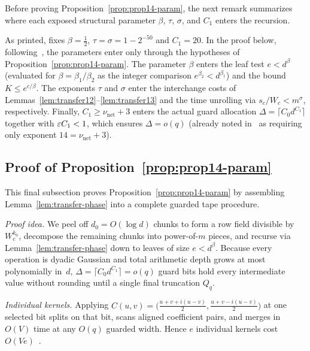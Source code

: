 Before proving Proposition~\ref{prop:prop14-param}, the next remark summarizes where each exposed structural parameter $\beta$, $\tau$, $\sigma$, and $C_1$ enters the recursion.

\begin{remark}\label{rem:prop14-ledger}\label{rem:walsh-delta}\label{rem:transfer-guard}
As printed, \cite[Prop.~14]{OAI26} fixes $\beta=\frac12$, $\tau=\sigma=1-2^{-50}$ and $C_1=20$. In the proof below,
following~\cite[\S\S5.1--5.4]{OAI26}, the parameters enter only through the hypotheses of
Proposition~\ref{prop:prop14-param}. The parameter $\beta$ enters the leaf test $e<d^\beta$ (evaluated for
$\beta=\beta_1/\beta_2$ as the integer comparison $e^{\beta_2}<d^{\beta_1}$) and the bound $K\le e^{c/\beta}$. The
exponents $\tau$ and $\sigma$ enter the interchange costs of Lemmas~\ref{lem:transfer12}--\ref{lem:transfer13} and the
time unrolling via $s_c/W_c<m^\sigma$, respectively. Finally, $C_1\ge\nu_{\mathrm{net}}+3$ enters the actual guard
allocation $\Delta=\lceil C_0d^{C_1}\rceil$ together with $\varepsilon C_1<1$, which ensures $\Delta=o(q)$ (already noted
in~\cite[\S5.4, p.~35]{OAI26} as requiring only exponent $14=\nu_{\mathrm{net}}+3$).
\end{remark}

\subsection{Proof of Proposition~\ref{prop:prop14-param}}\label{sec:transfer-layer}

This final subsection proves Proposition~\ref{prop:prop14-param} by assembling Lemma~\ref{lem:transfer-phase} into a complete guarded tape procedure.

\emph{Proof idea.}
We peel off $d_0=O(\log d)$ chunks to form a row field divisible by $W_c^{k_0}$, decompose the remaining chunks into power-of-$m$ pieces, and recurse via Lemma~\ref{lem:transfer-phase} down to leaves of size $e<d^\beta$. Because every operation is dyadic Gaussian and total arithmetic depth grows at most polynomially in~$d$, $\Delta=\lceil C_0 d^{C_1}\rceil=o(q)$ guard bits hold every intermediate value without rounding until a single final truncation $Q_q$.

\emph{Individual kernels.}
Applying $C(u,v)=\bigl(\frac{u+v+i(u-v)}2,\frac{u+v-i(u-v)}2\bigr)$ at one selected bit splits on that bit, scans aligned coefficient pairs, and merges in $O(V)$ time at any $O(q)$ guarded width. Hence $e$ individual kernels cost $O(Ve)$~\cite[\S5.3, (25)]{OAI26}.

